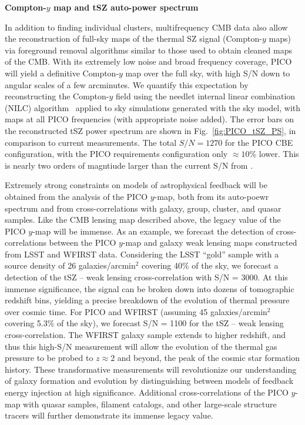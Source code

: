 \documentclass[PICOReport.tex]{subfiles}
\begin{document}
{\bf Compton-$y$ map and tSZ auto-power spectrum}

In addition to finding individual clusters, multifrequency CMB data also allow the reconstruction of full-sky maps of the thermal SZ signal (Compton-$y$ maps) via foreground removal algorithms similar to those used to obtain cleaned maps of the CMB.  With its extremely low noise and broad frequency coverage, PICO will yield a definitive Compton-$y$ map over the full sky, with high S/N down to angular scales of a few arcminutes.  We quantify this expectation by reconstructing the Compton-$y$ field using the needlet internal linear combination (NILC) algorithm~\cite{Delabrouille2009} applied to sky simulations generated with the \planck sky model, with maps at all PICO frequencies (with appropriate noise added).  The error bars on the reconstructed tSZ power spectrum are shown in Fig.~\ref{fig:PICO_tSZ_PS}, in comparison to current measurements.  The total $S/N = 1270$ for the PICO CBE configuration, with the PICO requirements configuration only $\approx 10$\% lower.  This is nearly two orders of magntiude larger than the current S/N from \planck.

Extremely strong constraints on models of astrophysical feedback will be obtained from the analysis of the PICO $y$-map, both from its auto-poewr spectrum and from cross-correlations with galaxy, group, cluster, and quasar samples.  Like the CMB lensing map described above, the legacy value of the PICO $y$-map will be immense.  As an example, we forecast the detection of cross-correlations between the PICO $y$-map and galaxy weak lensing maps constructed from LSST and WFIRST data.  Considering the LSST ``gold'' sample with a source density of 26 galaxies/arcmin${}^2$ covering 40\% of the sky, we forecast a detection of the tSZ -- weak lensing cross-correlation with S/N = 3000.  At this immense significance, the signal can be broken down into dozens of tomographic redshift bins, yielding a precise breakdown of the evolution of thermal pressure over cosmic time.  For PICO and WFIRST (assuming 45 galaxies/arcmin${}^2$ covering 5.3\% of the sky), we forecast S/N = 1100 for the tSZ -- weak lensing cross-correlation.  The WFIRST galaxy sample extends to higher redshift, and thus this high-S/N measurement will allow the evolution of the thermal gas pressure to be probed to $z \approx 2$ and beyond, the peak of the cosmic star formation history.  These transformative measurements will revolutionize our understanding of galaxy formation and evolution by distinguishing between models of feedback energy injection at high significance.  Additional cross-correlations of the PICO $y$-map with quasar samples, filament catalogs, and other large-scale structure tracers will further demonstrate its immense legacy value.
\end{document}
